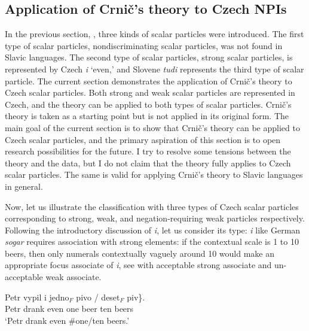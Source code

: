 \documentclass[output=paper,colorlinks,citecolor=brown]{langscibook}
\begin{document}
\subsection{Application of Crnič's theory to Czech NPIs}\label{application-of-crniux10s-theory-to-czech-npis}

In the previous section, , three kinds of scalar particles were introduced. The first type of scalar particles, nondiscriminating scalar particles, was not found in Slavic languages. The second type of scalar particles, strong scalar particles, is represented by Czech \emph{i} `even,' and Slovene \emph{tudi} represents the third type of scalar particle. The current section demonstrates the application of Crnič's theory to Czech scalar particles. Both strong and weak scalar particles are represented in Czech, and the theory can be applied to both types of scalar particles. Crnič's theory is taken as a starting point but is not applied in its original form. The main goal of the current section is to show that Crnič's theory can be applied to Czech scalar particles, and the primary aspiration of this section is to open research possibilities for the future. I try to resolve some tensions between the theory and the data, but I do not claim that the theory fully applies to Czech scalar particles. The same is valid for applying Crnič's theory to Slavic languages in general. 

Now, let us illustrate the classification with three types of Czech scalar particles corresponding to strong, weak, and negation-requiring weak particles respectively. Following the introductory discussion of \emph{i}, let us consider its type: \emph{i} like German \emph{sogar} requires association with strong elements: if the contextual scale is 1 to 10 beers, then only numerals contextually vaguely around 10 would make an appropriate focus associate of \emph{i}, see  with acceptable strong associate and un-acceptable weak associate.

\ea\label{ex:39} \gll Petr vypil i \minsp{\{\#} jedno$_F$ pivo / deset$_F$ piv\}.\\
Petr drank even {} one beer {} ten beers\\
\glt `Petr drank even \#one/ten beers.'
\z
\end{document}
